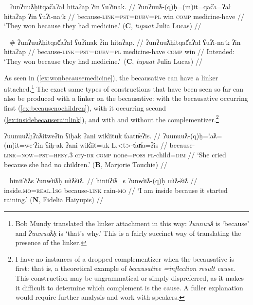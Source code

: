 \ex~ \label{ex:wonbecausemedicine}
\begingl
\glpreamble ʔunʔuuƛḥitqač̓aʔał hitaʔap ʔin ʕuʔinak. //
\gla ʔunʔuuƛ-(q)ḥ=(m)it=qač̓a=ʔał hitaʔap ʔin ʕuʔi-naˑk //
\glb because-\textsc{link}=\textsc{pst}=\textsc{dubv}=\textsc{pl} win \textsc{comp} medicine-have //
\glft `They won because they had medicine.' (\textbf{C}, \textit{tupaat} Julia Lucas) //
\endgl
\xe

\ex~ \label{ex:*wonbecausemedicine}
\begingl
\glpreamble \# ʔunʔuuƛḥitqač̓aʔał ʕuʔinak ʔin hitaʔap. //
\gla ʔunʔuuƛḥitqač̓aʔał ʕuʔi-naˑk ʔin hitaʔap //
\glb because-\textsc{link}=\textsc{pst}=\textsc{dubv}=\textsc{pl} medicine-have \textsc{comp} win //
\glft Intended: `They won because they had medicine.'\footnotemark\ (\textbf{C}, \textit{tupaat} Julia Lucas) //
\endgl
\xe


As seen in (\ref{ex:wonbecausemedicine}), the becausative can have a linker attached.\footnote{Bob Mundy translated the linker attachment in this way: \textit{ʔuunuuƛ} is `because' and \textit{ʔuunuuƛḥ} is `that's why.' This is a fairly succinct way of translating the presence of the linker.} The exact same types of constructions that have been seen so far can also be produced with a linker on the becausative: with the becausative occurring first (\ref{ex:becausenochildren}), with it occurring second (\ref{ex:insidebecauserainlink}), and with and without the complementizer.\footnote{I have no instances of a dropped complementizer when the becausative is first: that is, a theoretical example of \textit{becausative =inflection result cause}. This construction may be ungrammatical or simply dispreferred, as it makes it difficult to determine which complement is the cause. A fuller explanation would require further analysis and work with speakers.}

\ex \label{ex:becausenochildren}
\begingl
\glpreamble ʔuunuuƛḥʔaƛitweʔin ʕiḥak ʔani wik̓iituk t̓aatn̓eʔis. //
\gla ʔuunuuƛ-(q)ḥ=!aƛ=(m)it=weˑʔin ʕiḥ-ak ʔani wik̓iit=uk L.<t>-t̓an̓a=ʔis //
\glb because-\textsc{link}=\textsc{now}=\textsc{pst}=\textsc{hrsy.3} cry-\textsc{dr} \textsc{comp} none=\textsc{poss} \textsc{pl}-child=\textsc{dim} //
\glft `She cried because she had no children.' (\textbf{B}, Marjorie Touchie) //
\endgl
\xe

\ex~ \label{ex:insidebecauserainlink}
\begingl
\glpreamble hiniiʔiƛs ʔunw̓iiƛḥ m̓iƛšiƛ. //
\gla hiniiʔiƛ=s ʔunw̓iiƛ-(q)ḥ m̓iƛ-šiƛ //
\glb inside.\textsc{mo}=\textsc{real.1sg} because-\textsc{link} rain-\textsc{mo} //
\glft `I am inside because it started raining.' (\textbf{N}, Fidelia Haiyupis) //
\endgl
\xe

